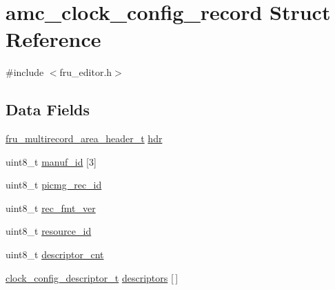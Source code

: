 \hypertarget{structamc__clock__config__record}{\section{amc\-\_\-clock\-\_\-config\-\_\-record Struct Reference}
\label{structamc__clock__config__record}
}


{\ttfamily \#include $<$fru\-\_\-editor.\-h$>$}

\subsection*{Data Fields}
\begin{DoxyCompactItemize}
\item 
\hyperlink{fru__editor_8h_ad6ac8d0278f7506c13b930cb39a818b3}{fru\-\_\-multirecord\-\_\-area\-\_\-header\-\_\-t} \hyperlink{structamc__clock__config__record_ab47e0e29b9bfd9e94cd02451b9809a8d}{hdr}
\item 
uint8\-\_\-t \hyperlink{structamc__clock__config__record_a0f6c1e01a1c2e428dad70e081642e713}{manuf\-\_\-id} \mbox{[}3\mbox{]}
\item 
uint8\-\_\-t \hyperlink{structamc__clock__config__record_ad026c13d38c2deacad8e1358b4676fd6}{picmg\-\_\-rec\-\_\-id}
\item 
uint8\-\_\-t \hyperlink{structamc__clock__config__record_a353e66f2a504c783f3b5d540211dd239}{rec\-\_\-fmt\-\_\-ver}
\item 
uint8\-\_\-t \hyperlink{structamc__clock__config__record_abb049827c3562c1c7284f152d5960ec6}{resource\-\_\-id}
\item 
uint8\-\_\-t \hyperlink{structamc__clock__config__record_a1d48dd736eb50484d9ef3ee5ba9d216a}{descriptor\-\_\-cnt}
\item 
\hyperlink{fru__editor_8h_adf38572ed4e11dba34ee513797847ba6}{clock\-\_\-config\-\_\-descriptor\-\_\-t} \hyperlink{structamc__clock__config__record_aa9e6b2513b79fe6491c18f0af5b9b2b7}{descriptors} \mbox{[}$\,$\mbox{]}
\end{DoxyCompactItemize}



